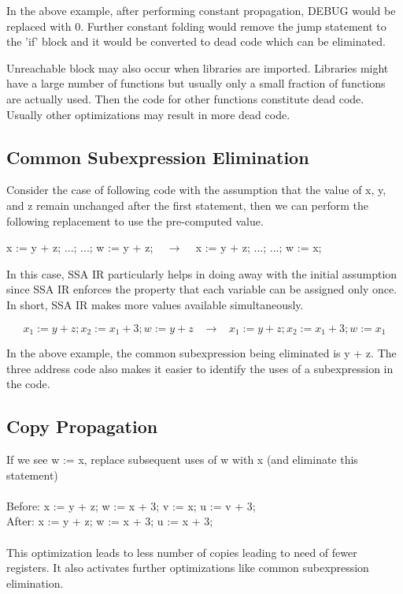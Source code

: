 In the above example, after performing constant propagation, DEBUG would be replaced with 0. Further constant folding would remove the jump statement to the 'if' block and it would be converted to dead code which can be eliminated.

Unreachable block may also occur when libraries are imported. Libraries might have a large number of functions but usually only a small fraction of functions are actually used. Then the code for other functions constitute dead code. Usually other optimizations may result in more dead code.

\subsection{Common Subexpression Elimination}

Consider the case of following code with the assumption that the value of x, y, and z remain unchanged after the first statement, then we can perform the following replacement to use the pre-computed value.

x := y + z;
...;
...;
w := y + z; $\;\;\; \rightarrow \;\;\;$ x := y + z; ...; ...; w := x;

In this case, SSA IR particularly helps in doing away with the initial assumption since SSA IR enforces the property that each variable can be assigned only once. In short, SSA IR makes more values available simultaneously.

\[x_1 := y + z; x_2 := x_1 + 3; w := y + z \;\;\; \rightarrow \;\;\; x_1 := y + z; x_2 := x_1 + 3; w := x_1\]

In the above example, the common subexpression being eliminated is y + z. The three address code also makes it easier to identify the uses of a subexpression in the code.

\subsection{Copy Propagation}

If we see w := x, replace subsequent uses of w with x (and eliminate this statement)\\
\\
Before: x := y + z; w := x + 3; v := x; u := v + 3;\\
After: x := y + z; w := x + 3; u := x + 3;\\
\\
This optimization leads to less number of copies leading to need of fewer registers. It also activates further optimizations like common subexpression elimination.

